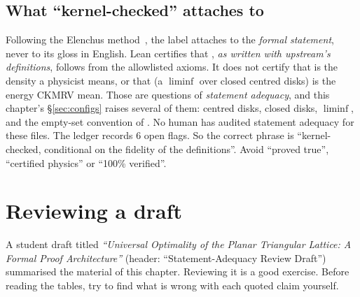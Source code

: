 \subsection{What ``kernel-checked'' attaches to}

Following the Elenchus method~\cite{elenchus}, the label \tierA{} attaches to the \emph{formal statement}, never to its
gloss in English. Lean certifies that , \emph{as written with upstream's definitions},
follows from the allowlisted axioms. It does not certify that  is the density a physicist means, or that
 (a $\liminf$ over closed centred disks) is the energy CKMRV mean. Those are questions of \emph{statement
adequacy}, and this chapter's \S\ref{sec:configs} raises several of them: centred disks, closed disks, $\liminf$, and
the empty-set convention of . No human has audited statement adequacy for these files. The ledger
records 6 open flags. So the correct phrase is ``kernel-checked, conditional on the fidelity of the definitions''.
Avoid ``proved true'', ``certified physics'' or ``100\% verified''.

\section{Reviewing a draft}
\label{sec:review}

A student draft titled \emph{``Universal Optimality of the Planar Triangular Lattice: A Formal Proof Architecture''}
(header: ``Statement-Adequacy Review Draft'') summarised the material of this chapter. Reviewing it is a good exercise.
Before reading the tables, try to find what is wrong with each quoted claim yourself.

